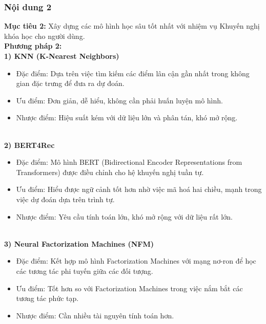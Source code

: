 \subsubsection{Nội dung 2}
\textbf{Mục tiêu 2:} Xây dựng các mô hình học sâu tốt nhất với nhiệm vụ Khuyến nghị khóa học cho người dùng.\\
\textbf{Phương pháp 2:}\\
\textbf{1) KNN (K-Nearest Neighbors)}
    \begin{itemize}
        \item Đặc điểm: Dựa trên việc tìm kiếm các điểm lân cận gần nhất trong không gian đặc trưng để đưa ra dự đoán.
        \item Ưu điểm: Đơn giản, dễ hiểu, không cần phải huấn luyện mô hình.
        \item Nhược điểm: Hiệu suất kém với dữ liệu lớn và phân tán, khó mở rộng.
    \end{itemize}\\
\textbf{2) BERT4Rec}
\begin{itemize}
    \item Đặc điểm: Mô hình BERT (Bidirectional Encoder Representations from Transformers) được điều chỉnh cho hệ khuyến nghị tuần tự.
    \item Ưu điểm: Hiểu được ngữ cảnh tốt hơn nhờ việc mã hoá hai chiều, mạnh trong việc dự đoán dựa trên trình tự.
    \item Nhược điểm: Yêu cầu tính toán lớn, khó mở rộng với dữ liệu rất lớn.
\end{itemize}\\
\textbf{3) Neural Factorization Machines (NFM)}
\begin{itemize}
    \item Đặc điểm: Kết hợp mô hình Factorization Machines với mạng nơ-ron để học các tương tác phi tuyến giữa các đối tượng.
    \item Ưu điểm: Tốt hơn so với Factorization Machines trong việc nắm bắt các tương tác phức tạp.
    \item Nhược điểm: Cần nhiều tài nguyên tính toán hơn.
\end{itemize}

